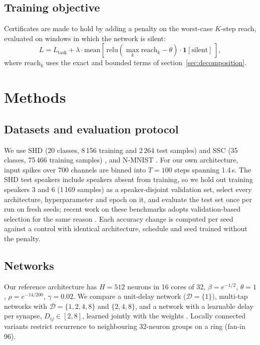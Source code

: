\documentclass{iopjournal}
\begin{document}
\subsection{Training objective}

Certificates are made to hold by adding a penalty on the worst-case $K$-step reach, evaluated on windows in which the network is silent:
\begin{equation}
L = L_{\mathrm{task}} + \lambda \cdot \mathrm{mean}\!\left[\, \mathrm{relu}\!\left(\max_k \mathrm{reach}_k - \theta\right) \cdot \mathbf{1}[\mathrm{silent}] \,\right],
\end{equation}
where $\mathrm{reach}_k$ uses the exact and bounded terms of section~\ref{sec:decomposition}.

\section{Methods}

\subsection{Datasets and evaluation protocol}

We use SHD (20 classes, 8\,156 training and 2\,264 test samples) and SSC (35 classes, 75\,466 training samples) \cite{shd}, and N-MNIST \cite{nmnist}. For our own architecture, input spikes over 700 channels are binned into $T=100$ steps spanning 1.4\,s. The SHD test speakers include speakers absent from training, so we hold out training speakers 3 and 6 (1\,169 samples) as a speaker-disjoint validation set, select every architecture, hyperparameter and epoch on it, and evaluate the test set once per run on fresh seeds; recent work on these benchmarks adopts validation-based selection for the same reason \cite{nowotny2025,meszaros2025,baronig2025,moro2026,delrec}. Each accuracy change is computed per seed against a control with identical architecture, schedule and seed trained without the penalty.

\subsection{Networks}
\label{sec:networks}

Our reference architecture has $H=512$ neurons in 16 cores of 32, $\beta=e^{-1/2}$, $\theta=1$, $\rho=e^{-14/200}$, $\gamma=0.02$. We compare a unit-delay network ($\mathcal{D}=\{1\}$), multi-tap networks with $\mathcal{D}=\{1,2,4,8\}$ and $\{2,4,8\}$, and a network with a learnable delay per synapse, $D_{ij}\in[2,8]$, learned jointly with the weights \cite{dcls}. Locally connected variants restrict recurrence to neighbouring 32-neuron groups on a ring (fan-in 96).
\end{document}
